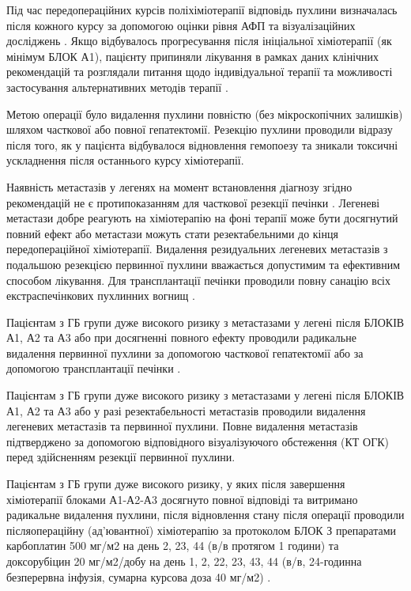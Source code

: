 Під час передопераційних курсів поліхіміотерапії відповідь пухлини визначалась після кожного курсу за допомогою оцінки рівня АФП та візуалізаційних досліджень \cite{pmid12461796}. Якщо відбувалось прогресування після ініціальної хіміотерапії (як мінімум БЛОК А1), пацієнту припиняли лікування в рамках даних клінічних рекомендацій та розглядали питання щодо індивідуальної терапії та можливості застосування альтернативних методів терапії \cite{pmid22648963}.

Метою операції було видалення пухлини повністю (без мікроскопічних залишків) шляхом часткової або повної гепатектомії. Резекцію пухлини проводили відразу після того, як у пацієнта відбувалося відновлення гемопоезу та зникали токсичні ускладнення після останнього курсу хіміотерапії\cite{pmid9494762}. 

Наявність метастазів у легенях на момент встановлення діагнозу згідно рекомендацій не є протипоказанням для часткової резекції печінки \cite{pmid18975296}. Легеневі метастази добре реагують на хіміотерапію на фоні терапії може бути досягнутий повний ефект або метастази можуть стати резектабельними до кінця передопераційної хіміотерапії. Видалення резидуальних легеневих метастазів з подальшою резекцією первинної пухлини вважається допустимим та ефективним способом лікування. Для трансплантації печінки проводили повну санацію всіх екстраспечінкових пухлинних вогнищ \cite{pmid8749932}.

Пацієнтам з ГБ групи дуже високого ризику з метастазами у легені після БЛОКІВ А1, А2 та А3 або при досягненні повного ефекту проводили радикальне видалення первинної пухлини за допомогою часткової гепатектомії або за допомогою трансплантації печінки \cite{pmid15862752}\cite{pmid24362406}.

Пацієнтам з ГБ групи дуже високого ризику з метастазами у легені після БЛОКІВ А1, А2 та А3 або у разі резектабельності метастазів проводили видалення легеневих метастазів та первинної пухлини. Повне видалення метастазів підтверджено за допомогою відповідного візуалізуючого обстеження (КТ ОГК) перед здійсненням резекції первинної пухлини\cite{pmid16045186}.

Пацієнтам з ГБ групи дуже високого ризику, у яких після завершення хіміотерапії блоками А1-А2-А3 досягнуто повної відповіді та витримано радикальне видалення пухлини, після відновлення стану після операції проводили післяопераційну (ад'ювантної) хіміотерапію за протоколом БЛОК З препаратами карбоплатин 500 мг/м2 на день 2, 23, 44 (в/в протягом 1 години) та доксорубіцин 20 мг/м2/добу на день 1, 2, 22, 23, 43, 44 (в/в, 24-годинна безперервна інфузія, сумарна курсова доза 40 мг/м2) \cite{pmid29761829}.

